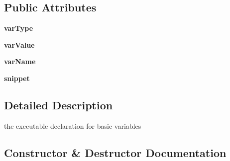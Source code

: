 \subsection*{Public Attributes}
\begin{DoxyCompactItemize}
\item 
{\bfseries var\+Type}\hypertarget{class_parsing_classes_actual_1_1_primitive_declaration_ae5fc258d63388772900ec90292bfa93b}{}\label{class_parsing_classes_actual_1_1_primitive_declaration_ae5fc258d63388772900ec90292bfa93b}

\item 
{\bfseries var\+Value}\hypertarget{class_parsing_classes_actual_1_1_primitive_declaration_aa004c4838a78727250c5e57800f7cc04}{}\label{class_parsing_classes_actual_1_1_primitive_declaration_aa004c4838a78727250c5e57800f7cc04}

\item 
{\bfseries var\+Name}\hypertarget{class_parsing_classes_actual_1_1_primitive_declaration_a4e97c443c0dea443025440db19cc6e8e}{}\label{class_parsing_classes_actual_1_1_primitive_declaration_a4e97c443c0dea443025440db19cc6e8e}

\item 
{\bfseries snippet}\hypertarget{class_parsing_classes_actual_1_1_primitive_declaration_a8089c6671008a7bca9d0fdb9a392a12b}{}\label{class_parsing_classes_actual_1_1_primitive_declaration_a8089c6671008a7bca9d0fdb9a392a12b}

\end{DoxyCompactItemize}


\subsection{Detailed Description}
the executable declaration for basic variables 

\subsection{Constructor \& Destructor Documentation}

